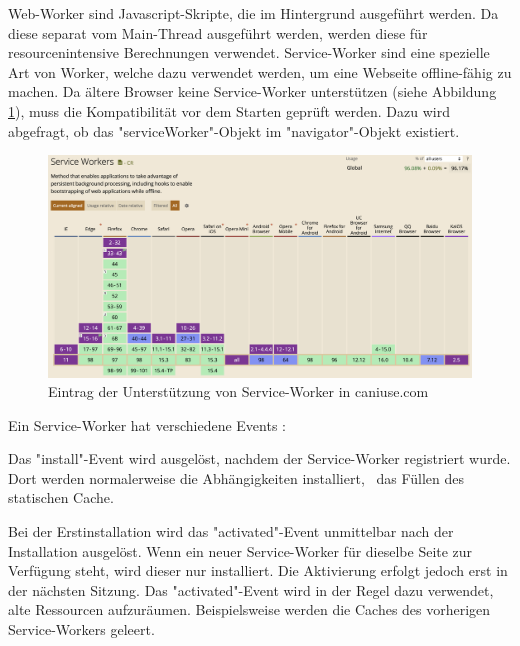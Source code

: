 

Web-Worker sind Javascript-Skripte, die im Hintergrund ausgeführt werden. 
Da diese separat vom Main-Thread ausgeführt werden, werden diese für resourcenintensive Berechnungen verwendet.
Service-Worker sind eine spezielle Art von Worker, welche dazu verwendet werden, um eine Webseite offline-fähig zu machen.
Da ältere Browser keine Service-Worker unterstützen (siehe Abbildung \ref{fig:CanIUseServiceWorker}), muss die Kompatibilität vor dem Starten geprüft werden. 
Dazu wird abgefragt, ob das "serviceWorker"-Objekt im "navigator"-Objekt existiert. 

\begin{figure}[H]
    \centering
    \includegraphics[width=\textwidth]{media/ServiceWorker/CanIUseServiceWorker.png}
    \caption{Eintrag der Unterstützung von Service-Worker in caniuse.com \cite{ciuServiceWorker}} 
    \label{fig:CanIUseServiceWorker}
\end{figure}

\clearpage


Ein Service-Worker hat verschiedene Events \cite{MDNCacheAPI}: 


Das "{\ttfamily install}"-Event wird ausgelöst, nachdem der Service-Worker registriert wurde. Dort werden normalerweise die Abhängigkeiten installiert, \zb\ das Füllen des statischen Cache.
    

Bei der Erstinstallation wird das "{\ttfamily activated}"-Event unmittelbar nach der Installation ausgelöst.
Wenn ein neuer Service-Worker für dieselbe Seite zur Verfügung steht, wird dieser nur installiert.
Die Aktivierung erfolgt jedoch erst in der nächsten Sitzung.
Das "{\ttfamily activated}"-Event wird in der Regel dazu verwendet, alte Ressourcen aufzuräumen. 
Beispielsweise werden die Caches des vorherigen Service-Workers geleert.

